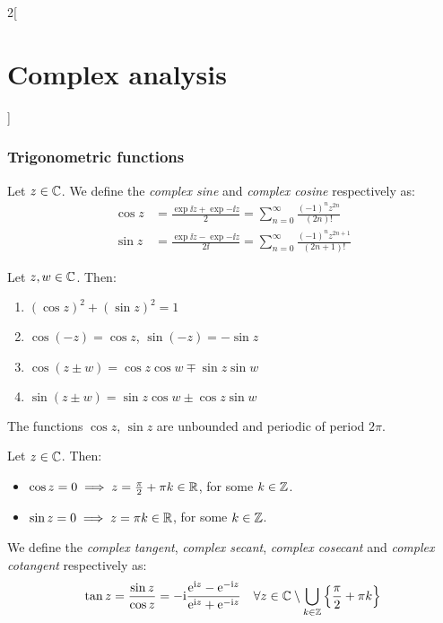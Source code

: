\documentclass[../../../main_math.tex]{subfiles}
\begin{document}
\begin{multicols}{2}[\section{Complex analysis}]
  \subsubsection{Trigonometric functions}
  \begin{definition}
    Let $z\in \mathbb{C}$. We define the \emph{complex sine} and \emph{complex cosine} respectively as:
    \begin{align*}
      \cos z & =\frac{\exp{\ii z}+\exp{-\ii z}}{2}=\sum_{n=0}^\infty\frac{(-1)^nz^{2n}}{(2n)!}        \\
      \sin z & =\frac{\exp{\ii z}-\exp{-\ii z}}{2\ii}=\sum_{n=0}^\infty\frac{(-1)^nz^{2n+1}}{(2n+1)!}
    \end{align*}
  \end{definition}
  \begin{proposition}
    Let $z,w\in\mathbb{C}$. Then:
    \begin{enumerate}
      \item ${\left(\cos z\right)}^2+{\left(\sin z\right)}^2=1$
      \item $\cos(-z)=\cos z$, $\sin(-z)=-\sin z$
      \item $\cos(z \pm w) = \cos z \cos w \mp \sin z \sin w$
      \item $\sin(z \pm w) = \sin z \cos w \pm \cos z \sin w$
    \end{enumerate}
  \end{proposition}
  \begin{proposition}
    The functions $\cos z$, $\sin z$ are unbounded and periodic of period $2\pi$.
  \end{proposition}
  \begin{proposition}
    Let $z\in \mathbb{C}$. Then:
    \begin{itemize}
      \item $\cos z=0\implies z=\frac{\pi}{2}+\pi k\in\mathbb{R}$, for some $k\in\mathbb{Z}$.
      \item $\sin z=0\implies z=\pi k\in\mathbb{R}$, for some $k\in\mathbb{Z}$.
    \end{itemize}
  \end{proposition}
  \begin{definition}
    We define the \emph{complex tangent}, \emph{complex secant}, \emph{complex cosecant} and \emph{complex cotangent} respectively as:
    \begin{align*}
      \tan z & = \frac{\sin z}{\cos z}=-\ii\frac{\exp{\ii z}-\exp{-\ii z}}{\exp{\ii z}+\exp{-\ii z}}\quad \forall z\in\CC\setminus\bigcup_{k\in\ZZ}\left\{\frac{\pi}{2}+\pi k\right\} \\

\end{align*}
\end{definition}
\end{multicols}
\end{document}
